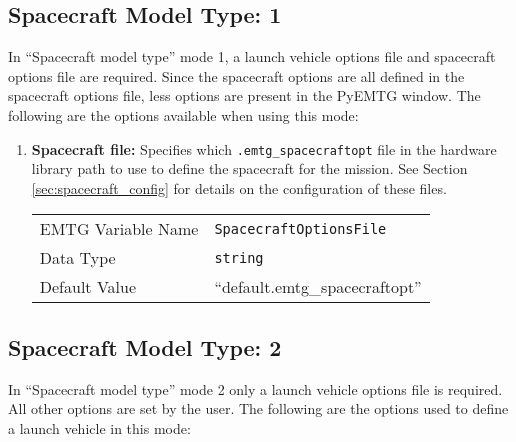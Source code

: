 \subsection{Spacecraft Model Type: 1}
In ``Spacecraft model type'' mode 1, a launch vehicle options file and spacecraft options file are required. Since the spacecraft options are all defined in the spacecraft options file, less options are present in the PyEMTG window. The following are the options available when using this mode:\\

\begin{enumerate}
    \item \textbf{Spacecraft file:} Specifies which {\tt .emtg\_spacecraftopt} file in the hardware library path to use to define the spacecraft for the mission. See Section \ref{sec:spacecraft_config} for details on the configuration of these files.
    \begin{table}[H]
        \hspace{2cm}
        \begin{tabular}{lp{5cm}}
        \ac{EMTG} Variable Name & \verb|SpacecraftOptionsFile| \\
        Data Type & \verb|string| \\
        Default Value & ``default.emtg\_spacecraftopt'' \\
        \end{tabular}
    \end{table}
\end{enumerate}



\subsection{Spacecraft Model Type: 2}
In ``Spacecraft model type'' mode 2 only a launch vehicle options file is required. All other options are set by the user. The following are the options used to define a launch vehicle in this mode:\\

